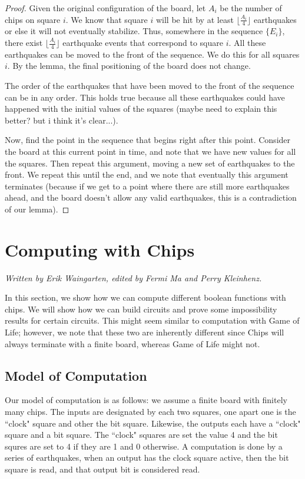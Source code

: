 \documentclass[runningheads,a4paper]{llncs}
\begin{document}
\begin{proof}
Given the original configuration of the board, let $A_i$ be the number of chips on square $i$. We know that square $i$ will be hit by at least $\lfloor \frac{A_i}{4} \rfloor$ earthquakes or else it will not eventually stabilize. Thus, somewhere in the sequence $\{E_i\}$, there exist $\lfloor \frac{A_i}{4} \rfloor$ earthquake events that correspond to square $i$. All these earthquakes can be moved to the front of the sequence. We do this for all squares $i$. By the lemma, the final positioning of the board does not change.

The order of the earthquakes that have been moved to the front of the sequence can be in any order. This holds true because all these earthquakes could have happened with the initial values of the squares (maybe need to explain this better? but i think it's clear...).

Now, find the point in the sequence that begins right after this point. Consider the board at this current point in time, and note that we have new values for all the squares. Then repeat this argument, moving a new set of earthquakes to the front. We repeat this until the end, and we note that eventually this argument terminates (because if we get to a point where there are still more earthquakes ahead, and the board doesn't allow any valid earthquakes, this is a contradiction of our lemma).

\end{proof}

\section{Computing with Chips}
\label{Computing with Chips}

\emph{Written by Erik Waingarten, edited by Fermi Ma and Perry Kleinhenz.}

In this section, we show how we can compute different boolean functions with chips. We will show how we can build circuits and prove some impossibility results for certain circuits. This might seem similar to computation with Game of Life; however, we note that these two are inherently different since Chips will always terminate with a finite board, whereas Game of Life might not.

\subsection{Model of Computation}

Our model of computation is as follows: we assume a finite board with finitely many chips. The inputs are designated by each two squares, one apart one is the ``clock" square and other the bit square. Likewise, the outputs each have a ``clock" square and a bit square. The ``clock" squares are set the value 4 and the bit squres are set to 4 if they are 1 and 0 otherwise. A computation is done by a series of earthquakes, when an output has the clock square active, then the bit square is read, and that output bit is considered read. 
\end{document}
